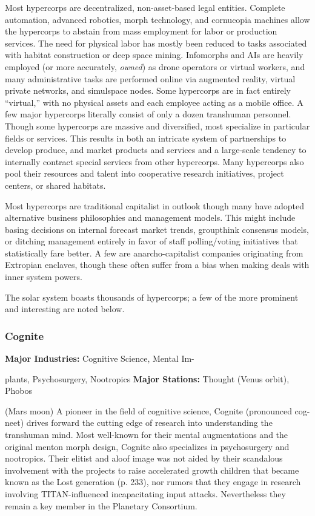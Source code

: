 Most hypercorps are decentralized, non-asset-based
legal entities. Complete automation, advanced
robotics, morph technology, and cornucopia machines
allow the hypercorps to abstain from mass
employment for labor or production services. The 
need for physical labor has mostly been reduced 
to tasks associated with habitat construction or 
deep space mining. Infomorphs and AIs are heavily 
employed (or more accurately, \textit{owned}) as drone operators
or virtual workers, and many administrative
tasks are performed online via augmented reality, 
virtual private networks, and simulspace nodes. 
Some hypercorps are in fact entirely ``virtual,'' with 
no physical assets and each employee acting as a 
mobile office. A few major hypercorps literally consist
of only a dozen transhuman personnel. Though
some hypercorps are massive and diversified, most 
specialize in particular fields or services. This results 
in both an intricate system of partnerships to develop
produce, and market products and services
and a large-scale tendency to internally contract 
special services from other hypercorps. Many hypercorps
also pool their resources and talent into
cooperative research initiatives, project centers, or 
shared habitats.

Most hypercorps are traditional capitalist in outlook
though many have adopted alternative business
philosophies and management models. This might 
include basing decisions on internal forecast market 
trends, groupthink consensus models, or ditching 
management entirely in favor of staff polling/voting 
initiatives that statistically fare better. A few are anarcho-capitalist
companies originating from Extropian
enclaves, though these often suffer from a bias when 
making deals with inner system powers.

The solar system boasts thousands of hypercorps; 
a few of the more prominent and interesting are 
noted below.

\subsubsection{Cognite}

\textbf{Major Industries:} Cognitive Science, Mental Im-

plants, Psychosurgery, Nootropics
\textbf{Major Stations:} Thought (Venus orbit), Phobos 

(Mars moon)
A pioneer in the field of cognitive science, Cognite 
(pronounced cog-neet) drives forward the cutting 
edge of research into understanding the transhuman 
mind. Most well-known for their mental augmentations
and the original menton morph design, Cognite
also specializes in psychosurgery and nootropics. 
Their elitist and aloof image was not aided by their 
scandalous involvement with the projects to raise accelerated
growth children that became known as the
Lost generation (p. 233), nor rumors that they engage 
in research involving TITAN-influenced incapacitating 
input attacks. Nevertheless they remain a key member 
in the Planetary Consortium.

